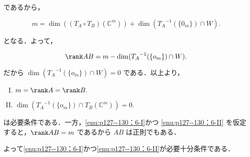 \begin{tproof}
  であるから，

  \[
    m = \dim((T_A \circ T_B)(\mathbb{C}^m)) + \dim({T_A}^{-1}(\{0_m\}) \cap W).
  \]

  となる．よって，

  \[
    \rank AB = m - \dim({T_A}^{-1}(\{o_m\}) \cap W).
  \]

  だから $\dim({T_A}^{-1}(\{o_m\}) \cap W) = 0$ である．以上より，

  \begin{enumerate}[(I)]
    \item $m = \rank A = \rank B.$ \label{enu:p127--130：6-I}
    \item $\dim({T_A}^{-1}(\{o_m\}) \cap T_B(\mathbb{C}^m)) = 0.$\label{enu:p127--130：6-II}
  \end{enumerate}

  は必要条件である．一方，\ref{enu:p127--130：6-I}かつ \ref{enu:p127--130：6-II} を仮定すると，$\rank AB = m$ であるから $AB$ は正則でもある．

  よって\ref{enu:p127--130：6-I}かつ\ref{enu:p127--130：6-II}が必要十分条件である．
\end{tproof}


